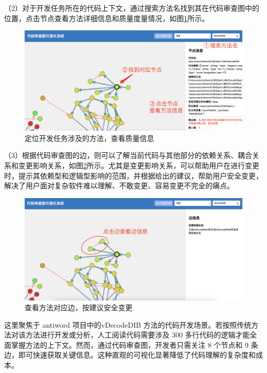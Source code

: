 \noindent（2）对于开发任务所在的代码上下文，通过搜索方法名找到其在代码审查图中的位置，点击节点查看方法详细信息和质量度量情况，如图\ref{1_定位开发任务涉及的方法，查看质量信息}所示。

\begin{figure}[h]
\centering
\includegraphics[width = 1.0\textwidth]{figures/开发2.jpg}
\caption{定位开发任务涉及的方法，查看质量信息}
\label{1_定位开发任务涉及的方法，查看质量信息}
\end{figure}

\noindent（3）根据代码审查图的边，则可以了解当前代码与其他部分的依赖关系、耦合关系和变更影响关系，如图\ref{1_查看方法对应边，按建议安全变更}所示。尤其是变更影响关系，可以帮助用户在进行变更时，提示其依赖型和逻辑型影响的范围，并根据给出的建议，帮助用户安全变更，解决了用户面对复杂软件难以理解、不敢变更、容易变更不完全的痛点。

\clearpage

\begin{figure}[h]
\centering
\includegraphics[width = 1.0\textwidth]{figures/开发3.jpg}
\caption{查看方法对应边，按建议安全变更}
\label{1_查看方法对应边，按建议安全变更}
\end{figure}

这里聚焦于 antiword 项目中的vDecodeDIB 方法的代码开发场景。若按照传统方法对该方法进行开发或分析，人工阅读代码需要涉及 300 多行代码的逻辑才能全面掌握方法的上下文。然而，通过代码审查图，开发者只需关注 8 个节点和 9 条边，即可快速获取关键信息。这种直观的可视化显著降低了代码理解的复杂度和成本。

